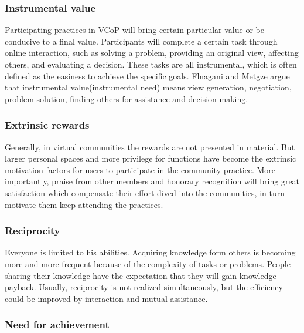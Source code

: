 \documentclass{elsarticle}
\begin{document}
  \subsubsection{Instrumental value}
\label{sec:instrumental-value}
  
Participating practices in VCoP will bring certain particular value or
be conducive to a final value\cite{Roennow-Rasmussen2002}. 
Participants will complete a certain task through
online interaction, such as solving a problem, providing an original
view, affecting others, and evaluating a decision. These tasks are all
instrumental, which is often defined as the easiness to achieve the
specific goals. Flnagani and Metgze argue that instrumental
value(instrumental need) means view generation, negotiation, problem
solution, finding others for assistance and decision making\cite{flanagin2001internet}.

\subsubsection{Extrinsic rewards}
\label{sec:extrinsic-rewards}


   Generally, in virtual communities the rewards are
  not presented in material. But larger personal spaces and more
  privilege for functions have become the extrinsic motivation factors
  for users to participate in the community practice.  More
  importantly,  praise from other members and
honorary recognition will bring great satisfaction which compensate
their effort dived into the communities, in turn motivate them keep
attending the practices\cite{Zhugea}.

\subsubsection{Reciprocity}
\label{sec:reciprocity}

Everyone is limited to his abilities. Acquiring knowledge form others
is becoming more and more frequent because of the complexity of tasks
or problems. People sharing their knowledge have the expectation that
they will gain knowledge payback.  Usually, reciprocity is not realized simultaneously, but the
efficiency could be improved by interaction and mutual assistance.

\subsubsection{Need for achievement}
\label{sec:need-achievement}
\end{document}
